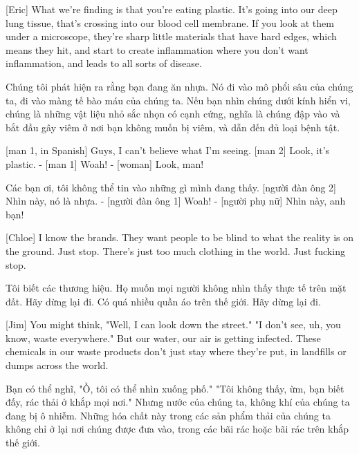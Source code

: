 \documentclass[a4paper]{article}
\begin{document}
	
	[Eric] What we're finding is that you're eating plastic.
	It's going into our deep lung tissue, that's crossing into our blood cell membrane.
	If you look at them under a microscope, they're sharp little materials that have hard edges, which means they hit, and start to create inflammation where you don't want inflammation, and leads to all sorts of disease.
	
	\begin{vietnamese-v2}
		[Eric] Chúng tôi phát hiện ra rằng bạn đang ăn nhựa.
		Nó đi vào mô phổi sâu của chúng ta, đi vào màng tế bào máu của chúng ta.
		Nếu bạn nhìn chúng dưới kính hiển vi, chúng là những vật liệu nhỏ sắc nhọn có cạnh cứng, nghĩa là chúng đập vào và bắt đầu gây viêm ở nơi bạn không muốn bị viêm, và dẫn đến đủ loại bệnh tật.
	\end{vietnamese-v2}
	
	[man 1, in Spanish] Guys, I can't believe what I'm seeing.
	[man 2] Look, it's plastic.
	- [man 1] Woah! - [woman] Look, man!
	
	\begin{vietnamese-v2}
		 Các bạn ơi, tôi không thể tin vào những gì mình đang thấy.
		[người đàn ông 2] Nhìn này, nó là nhựa.
		- [người đàn ông 1] Woah! - [người phụ nữ] Nhìn này, anh bạn!
	\end{vietnamese-v2}
	
	[Chloe] I know the brands. They want people to be blind to what the reality is on the ground.
	Just stop. There's just too much clothing in the world.
	Just fucking stop.
	
	\begin{vietnamese-v2}
		[Chloe] Tôi biết các thương hiệu. Họ muốn mọi người không nhìn thấy thực tế trên mặt đất.
		Hãy dừng lại đi. Có quá nhiều quần áo trên thế giới.
		Hãy dừng lại đi.
	\end{vietnamese-v2}
	
	[Jim] You might think, "Well, I can look down the street."
	"I don't see, uh, you know, waste everywhere."
	But our water, our air is getting infected.
	These chemicals in our waste products don't just stay where they're put, in landfills or dumps across the world.
	
	\begin{vietnamese-v2}
		[Jim] Bạn có thể nghĩ, "Ồ, tôi có thể nhìn xuống phố."
		"Tôi không thấy, ừm, bạn biết đấy, rác thải ở khắp mọi nơi."
		Nhưng nước của chúng ta, không khí của chúng ta đang bị ô nhiễm.
		Những hóa chất này trong các sản phẩm thải của chúng ta không chỉ ở lại nơi chúng được đưa vào, trong các bãi rác hoặc bãi rác trên khắp thế giới.
	\end{vietnamese-v2}
	
\end{document}
